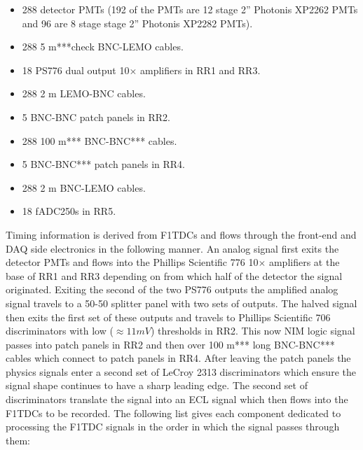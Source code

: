 \documentclass[review]{elsarticle}
\begin{document}
\begin{itemize}\itemsep6pt \parskip0pt 
	\item 288 detector PMTs (192 of the PMTs are 12 stage 2'' Photonis XP2262 PMTs and 96 are 8 stage stage 2'' Photonis XP2282 PMTs).
	\item 288 5 m***check BNC-LEMO cables. 
	\item 18 PS776 dual output 10$\times$ amplifiers in RR1 and RR3.
	\item 288 2 m LEMO-BNC cables. 
	\item 5 BNC-BNC patch panels in RR2. 
	\item 288 100 m*** BNC-BNC*** cables. 
	\item 5 BNC-BNC*** patch panels in RR4. 
	\item 288 2 m BNC-LEMO cables. 
	\item 18 fADC250s in RR5.
\end{itemize}

Timing information is derived from F1TDCs and flows through the front-end and DAQ side electronics in the following manner. An analog signal first exits the detector PMTs and flows into the Phillips Scientific 776 10$\times$ amplifiers at the base of RR1 and RR3 depending on from which half of the detector the signal originated. Exiting the second of the two PS776 outputs the amplified analog signal travels to a 50-50 splitter panel with two sets of outputs. The halved signal then exits the first set of these outputs and travels to Phillips Scientific 706 discriminators with low ($\approx 11 mV$) thresholds in RR2. This now NIM logic signal passes into patch panels in RR2 and then over 100 m*** long BNC-BNC*** cables which connect to patch panels in RR4. After leaving the patch panels the physics signals enter a second set of LeCroy 2313 discriminators which ensure the signal shape continues to have a sharp leading edge. The second set of discriminators translate the signal into an ECL signal which then flows into the F1TDCs to be recorded. The following list gives each component dedicated to processing the F1TDC signals in the order in which the signal passes through them:\\
\end{document}
